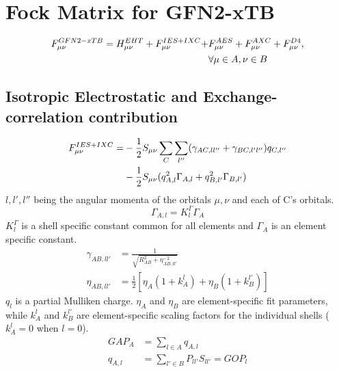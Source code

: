\section{Fock Matrix for GFN2-xTB}
\begin{equation}
\begin{split}
    F^{GFN2-xTB}_{\mu\nu} =  H^{EHT}_{\mu\nu} + F^{IES+IXC}_{\mu\nu} + &F^{AES}_{\mu\nu}+F^{AXC}_{\mu\nu}+F^{D4}_{\mu\nu}, \\&\forall \mu \in A, \nu \in B
\end{split}
\end{equation}
\subsection{Isotropic Electrostatic and Exchange-correlation contribution}
\begin{equation}
\begin{split}
    F^{IES+IXC}_{\mu\nu} = &- \frac{1}{2}S_{\mu\nu}\sum_C\sum_{l''}(\gamma_{AC,ll''}+\gamma_{BC,l'l''})q_{C,l''}\\
    &-\frac{1}{2}S_{\mu\nu}(q_{A,l}^2\Gamma_{A,l}+q_{B,l'}^2\Gamma_{B,l'})
\end{split}
\end{equation}
$l,l',l''$ being the angular momenta of the orbitals $\mu, \nu$ and each of C's orbitals. 
\begin{equation}
    \Gamma_{A,l} = K^\Gamma_l\Gamma_A
\end{equation}
$K^\Gamma_l$ is a shell specific constant common for all elements and $\Gamma_A$ is an element specific constant. 
\begin{align}
    \gamma_{AB,ll'} &= \frac{1}{\sqrt{R_{AB}^2+\eta^{-2}_{AB,ll'}}}\\
    \eta_{AB,ll'}&=\frac{1}{2}\left[\eta_A(1+k_A^l)+\eta_B(1+k_B^{l'})\right]
\end{align}
$q_l$ is a partial Mulliken charge. $\eta_A$ and $\eta_B$ are element-specific fit parameters, while $k_A^l$ and $k_B^{l'}$ are element-specific scaling factors for the individual shells ($k_A^l=0$ when $l=0$).
\begin{align}
    GAP_A &= \sum_{l \in A} q_{A,l}\\
    q_{A,l} &= \sum_{l'\in B}P_{ll'}S_{ll'} = GOP_l
\end{align}

